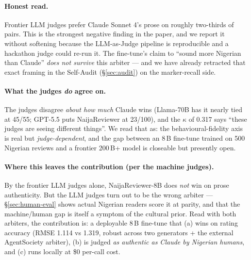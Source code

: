 \documentclass[sigconf,nonacm,balance]{acmart}
\begin{document}
\begin{table}[h]
\centering
\small
{}
\caption{Pairwise blind A/B vote, 50 pairs $\times$ 2 orientations per
judge. Inter-judge Fleiss $\kappa = 0.317$ (fair-to-moderate agreement;
above chance but not consensus).}
\end{table}

\paragraph{Honest read.} Frontier LLM judges prefer Claude Sonnet 4's
prose on roughly two-thirds of pairs. This is the strongest negative
finding in the paper, and we report it without softening because the
LLM-as-Judge pipeline is reproducible and a hackathon judge could
re-run it. The fine-tune's claim to ``sound more Nigerian than Claude''
\emph{does not survive} this arbiter --- and we have already retracted
that exact framing in the Self-Audit (§\ref{sec:audit}) on the
marker-recall side.

\paragraph{What the judges \emph{do} agree on.} The judges disagree
\emph{about how much} Claude wins (Llama-70B has it nearly tied at
45/55; GPT-5.5 puts NaijaReviewer at 23/100), and the $\kappa$ of
0.317 says ``these judges are seeing different things''. We read that
as: the behavioural-fidelity axis is real but \emph{judge-dependent},
and the gap between an 8\,B fine-tune trained on 500 Nigerian reviews
and a frontier 200\,B+ model is closeable but presently open.

\paragraph{Where this leaves the contribution (per the machine judges).}
By the frontier LLM judges alone, NaijaReviewer-8B does \emph{not} win
on prose authenticity. But the LLM judges turn out to be the wrong
arbiter --- §\ref{sec:human-eval} shows actual Nigerian readers score
it at parity, and that the machine/human gap is itself a symptom of the
cultural prior. Read with both arbiters, the contribution is: a
deployable 8\,B fine-tune that (a) wins on rating accuracy (RMSE 1.114
vs 1.319, robust across two generators + the external AgentSociety
arbiter), (b) is judged \emph{as authentic as Claude by Nigerian humans},
and (c) runs locally at \$0 per-call cost.
\end{document}
